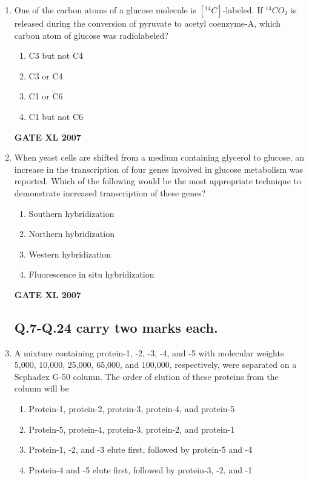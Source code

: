 \documentclass[journal,12pt,onecolumn]{IEEEtran}
\begin{document}
\begin{enumerate}
    \item One of the carbon atoms of a glucose molecule is $[^{14}C]$-labeled. If $^{14}CO_{2}$ is released during the conversion of pyruvate to acetyl coenzyme-A, which carbon atom of glucose was radiolabeled? 
        \begin{enumerate} 
            \item C3 but not C4
            \item C3 or C4
            \item C1 or C6
            \item C1 but not C6
        \end{enumerate}
	    \hfill \textbf{GATE XL 2007}

    \item When yeast cells are shifted from a medium containing glycerol to glucose, an increase in the transcription of four genes involved in glucose metabolism was reported. Which of the following would be the most appropriate technique to demonstrate increased transcription of these genes? 
    \begin{multicols}{2}
        \begin{enumerate} 
            \item Southern hybridization
            \item Northern hybridization
            \item Western hybridization
            \item Fluorescence in situ hybridization
        \end{enumerate}
    \end{multicols}
	    \hfill \textbf{GATE XL 2007}

\subsection*{Q.7-Q.24 carry two marks each.}

    \item A mixture containing protein-1, -2, -3, -4, and -5 with molecular weights 5,000, 10,000, 25,000, 65,000, and 100,000, respectively, were separated on a Sephadex G-50 column. The order of elution of these proteins from the column will be 
        \begin{enumerate} 
            \item Protein-1, protein-2, protein-3, protein-4, and protein-5
            \item Protein-5, protein-4, protein-3, protein-2, and protein-1
            \item Protein-1, -2, and -3 elute first, followed by protein-5 and -4
            \item Protein-4 and -5 elute first, followed by protein-3, -2, and -1
        \end{enumerate}


\end{enumerate}
\end{document}
